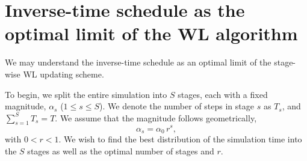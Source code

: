\documentclass[reprint, floatfix]{revtex4-1}
\begin{document}
\section{\label{sec:wltoinvt}
Inverse-time schedule as the optimal limit of the WL algorithm}


We may understand the inverse-time schedule %
as an optimal limit of the stage-wise WL updating scheme.
%

To begin, we split the entire simulation into $S$ stages,
each with a fixed magnitude, $\alpha_s$ ($1 \le s \le S$).
%
We denote the number of steps in stage $s$ as $T_s$, and
$\sum_{s=1}^S T_s = T$.
%
%
We assume that
the magnitude follows geometrically,
%
\begin{equation}
  \alpha_s = \alpha_0 \, r^s
  ,
  \label{eq:alphas}
\end{equation}
%
with $0 < r < 1$.
%
%
We wish to find the best distribution of the simulation time
into the $S$ stages
as well as
the optimal number of stages and $r$.
\end{document}
